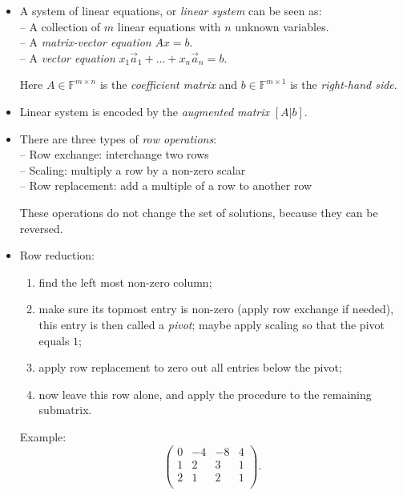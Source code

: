 \documentclass[11pt]{article}
\newcommand{\1}{\mathbf{1}}
\newcommand{\0}{\mathbf{0}}
\newcommand{\F}{\mathbb{F}}
\newcommand{\va}{\vec{a}}
\begin{document}
\begin{itemize}

\item

A system of linear equations, or \emph{linear system} can be seen as:
\\ --
A collection of $m$ linear equations with $n$ unknown variables.
\\ --
A \emph{matrix-vector equation} $A x  = b $.
\\ --
A \emph{vector equation} $x_1 \va_1 + \dots + x_n \va_n = b $.

Here $A \in \F^{m \times n}$ is the \emph{coefficient matrix} and $b \in \F^{m \times 1}$ is the \emph{right-hand side}.

\item

Linear system is encoded by the \emph{augmented matrix} $[A \big| b ]$.

\item

There are three types of \emph{row operations}:
\\ --
Row exchange: interchange two rows
\\ --
Scaling: multiply a row by a non-zero scalar
\\ --
Row replacement: add a multiple of a row to another row

These operations do not change the set of solutions, because they can be reversed.

\item

Row reduction:
\begin{enumerate}
\item find the left most non-zero column;
\item make sure its topmost entry is non-zero (apply row exchange if needed), this entry is then called a \emph{pivot}; maybe apply scaling so that the pivot equals $1$;
\item apply row replacement to zero out all entries below the pivot;
\item now leave this row alone, and apply the procedure to the remaining submatrix.
\end{enumerate}

Example:
\vspace{-1em}
\[
\left(\begin{array}{rrr|r}
0 & -4 & -8 & 4 \\
1 &  2 &  3 & 1 \\
2 &  1 &  2 & 1 \\
\end{array}\right).
\]


\end{itemize}
\end{document}
